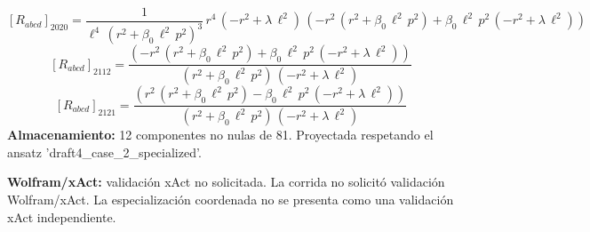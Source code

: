 \documentclass[11pt]{article}
\begin{document}
\begin{dmath*}[breakdepth={5}]
\left[R_{abcd}\right]_{2020} = \frac{1}{{\ell}^{4}\,{\left({r}^{2} + \beta_{0}\,{\ell}^{2}\,{p}^{2}\right)}^{3}}\,{r}^{4}\,\left(-{r}^{2} + \lambda\,{\ell}^{2}\right)\,\left(-{r}^{2}\,\left({r}^{2} + \beta_{0}\,{\ell}^{2}\,{p}^{2}\right) + \beta_{0}\,{\ell}^{2}\,{p}^{2}\,\left(-{r}^{2} + \lambda\,{\ell}^{2}\right)\right)
\end{dmath*}
\begin{dmath*}[breakdepth={5}]
\left[R_{abcd}\right]_{2112} = \frac{\left(-{r}^{2}\,\left({r}^{2} + \beta_{0}\,{\ell}^{2}\,{p}^{2}\right) + \beta_{0}\,{\ell}^{2}\,{p}^{2}\,\left(-{r}^{2} + \lambda\,{\ell}^{2}\right)\right)}{\left({r}^{2} + \beta_{0}\,{\ell}^{2}\,{p}^{2}\right)\,\left(-{r}^{2} + \lambda\,{\ell}^{2}\right)}
\end{dmath*}
\begin{dmath*}[breakdepth={5}]
\left[R_{abcd}\right]_{2121} = \frac{\left({r}^{2}\,\left({r}^{2} + \beta_{0}\,{\ell}^{2}\,{p}^{2}\right) - \beta_{0}\,{\ell}^{2}\,{p}^{2}\,\left(-{r}^{2} + \lambda\,{\ell}^{2}\right)\right)}{\left({r}^{2} + \beta_{0}\,{\ell}^{2}\,{p}^{2}\right)\,\left(-{r}^{2} + \lambda\,{\ell}^{2}\right)}
\end{dmath*}
\textbf{Almacenamiento:} 12 componentes no nulas de 81. Proyectada respetando el ansatz 'draft4\_case\_2\_specialized'.\par
\textbf{Wolfram/xAct:} validación xAct no solicitada. La corrida no solicitó validación Wolfram/xAct. La especialización coordenada no se presenta como una validación xAct independiente.\par\medskip
{}
\end{document}
